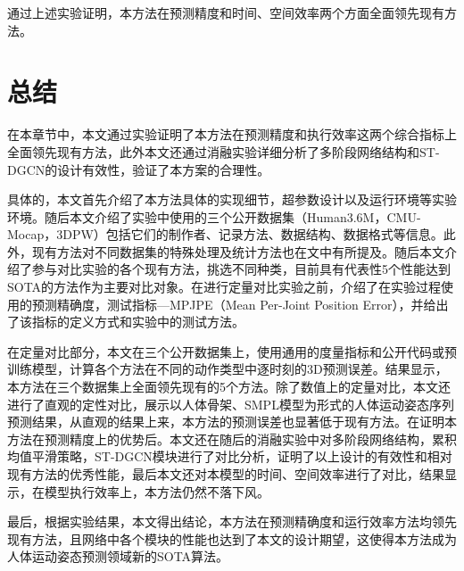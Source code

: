 通过上述实验证明，本方法在预测精度和时间、空间效率两个方面全面领先现有方法。

\section{总结}
在本章节中，本文通过实验证明了本方法在预测精度和执行效率这两个综合指标上全面领先现有方法，此外本文还通过消融实验详细分析了多阶段网络结构和ST-DGCN的设计有效性，验证了本方案的合理性。

具体的，本文首先介绍了本方法具体的实现细节，超参数设计以及运行环境等实验环境。随后本文介绍了实验中使用的三个公开数据集（Human3.6M，CMU-Mocap，3DPW）包括它们的制作者、记录方法、数据结构、数据格式等信息。此外，现有方法对不同数据集的特殊处理及统计方法也在文中有所提及。随后本文介绍了参与对比实验的各个现有方法，挑选不同种类，目前具有代表性5个性能达到SOTA的方法作为主要对比对象。在进行定量对比实验之前，介绍了在实验过程使用的预测精确度，测试指标—MPJPE（Mean Per-Joint Position Error），并给出了该指标的定义方式和实验中的测试方法。

在定量对比部分，本文在三个公开数据集上，使用通用的度量指标和公开代码或预训练模型，计算各个方法在不同的动作类型中逐时刻的3D预测误差。结果显示，本方法在三个数据集上全面领先现有的5个方法。除了数值上的定量对比，本文还进行了直观的定性对比，展示以人体骨架、SMPL模型为形式的人体运动姿态序列预测结果，从直观的结果上来，本方法的预测误差也显著低于现有方法。在证明本方法在预测精度上的优势后。本文还在随后的消融实验中对多阶段网络结构，累积均值平滑策略，ST-DGCN模块进行了对比分析，证明了以上设计的有效性和相对现有方法的优秀性能，最后本文还对本模型的时间、空间效率进行了对比，结果显示，在模型执行效率上，本方法仍然不落下风。

最后，根据实验结果，本文得出结论，本方法在预测精确度和运行效率方法均领先现有方法，且网络中各个模块的性能也达到了本文的设计期望，这使得本方法成为人体运动姿态预测领域新的SOTA算法。


